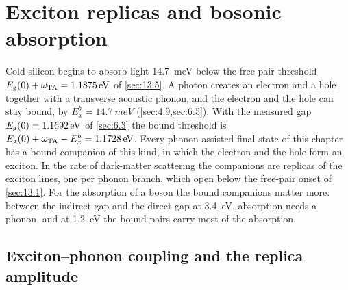 \section{Exciton replicas and bosonic absorption}\label{sec:13.8}

Cold silicon begins to absorb light \SI{14.7}{meV} below the free-pair threshold $E_{\mathrm{g}}(0) + \omega_{\mathrm{TA}} = \SI{1.1875}{eV}$ of \cref{sec:13.5}. A photon creates an electron and a hole together with a transverse acoustic phonon, and the electron and the hole can stay bound, by $E_x^b = \SI{14.7}{meV}$ (\cref{sec:4.9,sec:6.5}). With the measured gap $E_{\mathrm{g}}(0) = \SI{1.1692}{eV}$ of \cref{sec:6.3} the bound threshold is $E_{\mathrm{g}}(0) + \omega_{\mathrm{TA}} - E_x^b = \SI{1.1728}{eV}$. Every phonon-assisted final state of this chapter has a bound companion of this kind, in which the electron and the hole form an exciton. In the rate of dark-matter scattering the companions are replicas of the exciton lines, one per phonon branch, which open below the free-pair onset of \cref{sec:13.1}. For the absorption of a boson the bound companions matter more: between the indirect gap and the direct gap at \SI{3.4}{eV}, absorption needs a phonon, and at \SI{1.2}{eV} the bound pairs carry most of the absorption.

\subsection{Exciton--phonon coupling and the replica amplitude}

